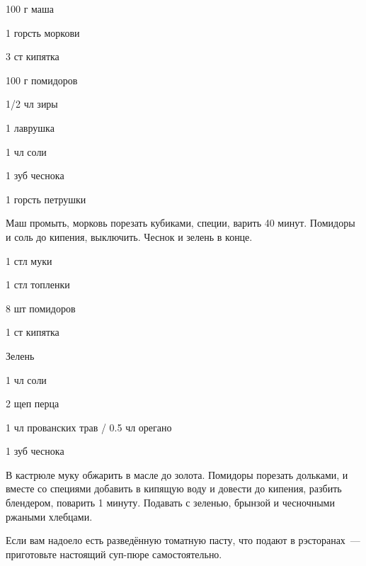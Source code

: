 {
\item 100 г маша
\item 1 горсть моркови
\item 3 ст кипятка
\item 100 г помидоров
}{
\item 1/2 чл зиры
\item 1 лаврушка
\item 1 чл соли
\item 1 зуб чеснока
\item 1 горсть петрушки
}{
Маш промыть, морковь порезать кубиками, специи, варить 40 минут. Помидоры и соль до кипения, выключить. Чеснок и зелень в конце.
}{}{}




{
\item 1 стл муки 
\item 1 стл топленки
\item 8 шт помидоров
\item 1 ст кипятка
\item Зелень 
}{
\item 1 чл соли
\item 2 щеп перца
\item 1 чл прованских трав / 0.5 чл орегано
\item 1 зуб чеснока
}{
В кастрюле муку обжарить в масле до золота. Помидоры порезать дольками, и вместе со специями добавить в кипящую воду и довести до кипения, разбить блендером, поварить 1 минуту. Подавать с зеленью, брынзой и чесночными ржаными хлебцами.
}{
\begin{advice}
\item Если вам надоело есть разведённую томатную пасту, что подают в рэсторанах~--- приготовьте настоящий суп-пюре самостоятельно.
\end{advice}}{}



